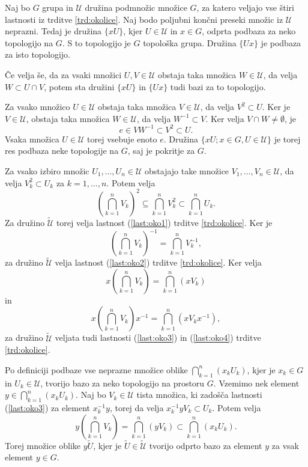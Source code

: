 \documentclass[mat1]{fmfdelo}
\newcommand{\Ucurl}{\mathcal{U}}
\begin{document}
\begin{izrek}\label{izr:bazaokolice}
Naj bo $G$ grupa in $\Ucurl$ družina podmnožic množice $G$, za katero veljajo vse štiri lastnosti iz trditve \ref{trd:okolice}. Naj bodo poljubni končni preseki množic iz $\Ucurl$ neprazni. Tedaj je družina $\lbrace xU \rbrace$, kjer $U \in \Ucurl$ in $x \in G$, odprta podbaza za neko topologijo na $G$. S to topologijo je $G$ topološka grupa. Družina $\lbrace Ux \rbrace$ je podbaza za isto topologijo.

Če velja še, da za vsaki množici $U,V \in \Ucurl$ obstaja taka množica $W \in \Ucurl$, da velja $W \subset U \cap V$, potem sta družini $\lbrace xU \rbrace$ in $\lbrace Ux \rbrace$ tudi bazi za to topologijo.
\end{izrek}

\begin{dokaz}
Za vsako množico $U \in \Ucurl$ obstaja taka množica $V \in \Ucurl$, da velja $V^2 \subset U$. Ker je $V \in \Ucurl$, obstaja taka množica $W \in \Ucurl$, da velja $W^{-1} \subset V$. Ker velja $V \cap W \neq \emptyset$, je
\[ e \in VW^{-1} \subset V^2 \subset U. \]
Vsaka množica $U \in \Ucurl$ torej vsebuje enoto $e$.
Družina $\lbrace xU ; x \in G, U \in \Ucurl \rbrace$ je torej res podbaza neke topologije na $G$, saj je pokritje za $G$.

Za vsako izbiro množic $U_1,\dots,U_n \in \Ucurl$ obstajajo take množice $V_1,\dots,V_n \in \Ucurl$, da velja $V_k^2 \subset U_k$ za $k = 1,\dots,n$. Potem velja
\[ \left( \bigcap_{k=1}^n V_k \right)^2 \subseteq \bigcap_{k=1}^n V_k^2 \subset \bigcap_{k=1}^n U_k. \]
Za družino $\widetilde{\Ucurl}$ torej velja lastnost (\ref{last:oko1}) trditve \ref{trd:okolice}.
Ker je \[\left( \bigcap_{k=1}^n V_k \right)^{-1} = \bigcap_{k=1}^n V_k^{-1},\] za družino $\widetilde{\Ucurl}$ velja lastnost (\ref{last:oko2}) trditve \ref{trd:okolice}.
Ker velja \[x\left(\bigcap_{k=1}^n V_k\right) = \bigcap_{k=1}^n (xV_k)\]
in \[ x\left(\bigcap_{k=1}^n V_k\right)x^{-1} = \bigcap_{k=1}^n (xV_kx^{-1}), \]
za družino $\widetilde{\Ucurl}$ veljata tudi lastnosti (\ref{last:oko3}) in (\ref{last:oko4}) trditve \ref{trd:okolice}.

Po definiciji podbaze vse neprazne množice oblike $\bigcap_{k=1}^n(x_kU_k)$, kjer je $x_k \in G$ in $U_k \in \Ucurl$, tvorijo bazo za neko topologijo na prostoru $G$. Vzemimo nek element $y \in \bigcap_{k=1}^n (x_kU_k)$. Naj bo $V_k \in \Ucurl$ tista množica, ki zadošča lastnosti (\ref{last:oko3}) za element $x_k^{-1}y$, torej da velja $x_k^{-1}yV_k \subset U_k$. Potem velja
\[ y\left(\bigcap_{k=1}^nV_k\right) = \bigcap_{k=1}^n(yV_k) \subset \bigcap_{k=1}^n(x_kU_k). \]
Torej množice oblike $y\widetilde{U}$, kjer je $\widetilde{U} \in \widetilde{\Ucurl}$ tvorijo odprto bazo za element $y$ za vsak element $y \in G$.


\end{dokaz}
\end{document}
